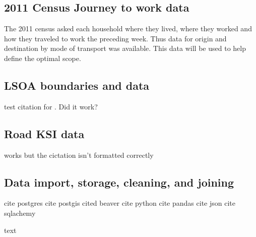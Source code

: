 \subsection{2011 Census Journey to work data}

The 2011 census asked each household where they lived, where they worked and how they traveled to work the preceding week. Thus data for origin and destination by mode of transport was available. This data will be used to help define the optimal scope. 

\cite{jtw}

\subsection{LSOA boundaries and data}
	
test citation for \cite{lsoageoms}. Did it work?
	
\subsection{Road KSI data}
	
	
	works but the cictation isn't formatted correctly
	\cite{cyclistksi}
	
\subsection{Data import, storage, cleaning, and joining}

cite postgres
cite postgis
cited beaver
cite python
cite pandas
cite json
cite sqlachemy

text